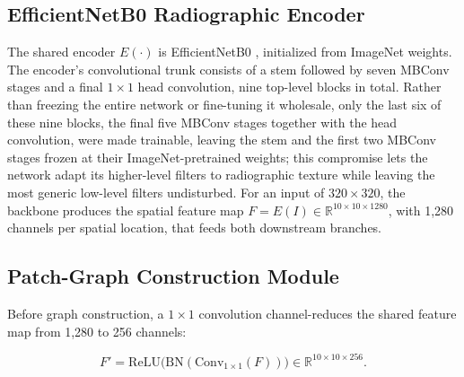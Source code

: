 \documentclass[conference]{IEEEtran}
\begin{document}
\subsection{EfficientNetB0 Radiographic Encoder}
\label{sec:encoder}
The shared encoder $E(\cdot)$ is EfficientNetB0 \cite{tan2019efficientnet}, initialized from ImageNet weights. The encoder's convolutional trunk consists of a stem followed by seven MBConv stages and a final $1\times1$ head convolution, nine top-level blocks in total. Rather than freezing the entire network or fine-tuning it wholesale, only the last six of these nine blocks, the final five MBConv stages together with the head convolution, were made trainable, leaving the stem and the first two MBConv stages frozen at their ImageNet-pretrained weights; this compromise lets the network adapt its higher-level filters to radiographic texture while leaving the most generic low-level filters undisturbed. For an input of $320 \times 320$, the backbone produces the spatial feature map $F = E(I) \in \mathbb{R}^{10\times10\times1280}$, with 1,280 channels per spatial location, that feeds both downstream branches.

\subsection{Patch-Graph Construction Module}
\label{sec:patchgraph}
Before graph construction, a $1\times1$ convolution channel-reduces the shared feature map from 1,280 to 256 channels:

\begingroup
\small
\begin{equation}
\label{eq:proj}
F' = \mathrm{ReLU}\big(\mathrm{BN}(\mathrm{Conv}_{1\times1}(F))\big) \in \mathbb{R}^{10\times10\times256}.
\end{equation}
\endgroup
\end{document}
